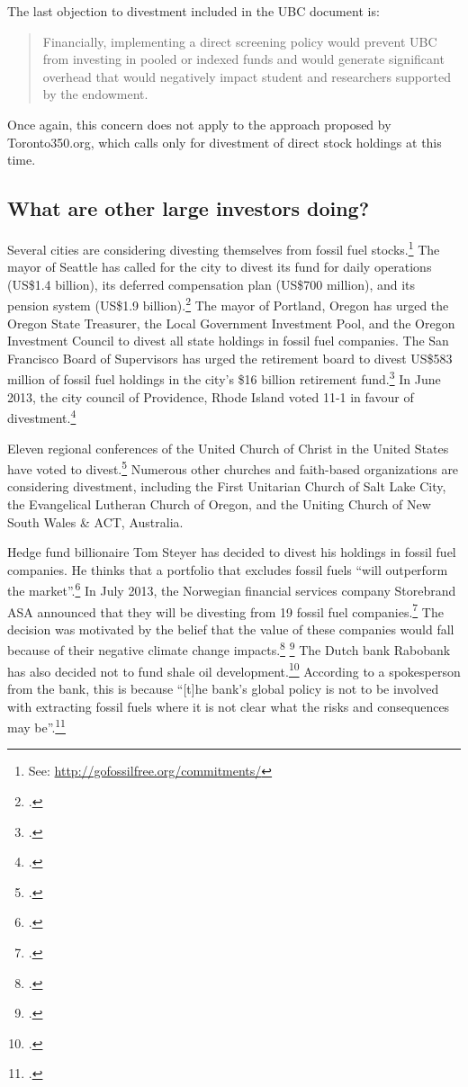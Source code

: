 The last objection to divestment included in the UBC document is:
\begin{quote}
Financially, implementing a direct screening policy would prevent UBC from investing in pooled or indexed funds and would generate significant overhead that would negatively impact student and researchers supported by the endowment.
\end{quote}
Once again, this concern does not apply to the approach proposed by Toronto350.org, which calls only for divestment of direct stock holdings at this time.



	\subsection{What are other large investors doing?}
	\label{LargeInvestors}



Several cities are considering divesting themselves from fossil fuel stocks.\footnote{See: \url{http://gofossilfree.org/commitments/}}
The mayor of Seattle has called for the city to divest its fund for daily operations (US\$1.4 billion), its deferred compensation plan (US\$700 million), and its pension system (US\$1.9 billion).\footcite[][]{SeattleDivest}
The mayor of Portland, Oregon has urged the Oregon State Treasurer, the Local Government Investment Pool, and the Oregon Investment Council to divest all state holdings in fossil fuel companies.
The San Francisco Board of Supervisors has urged the retirement board to divest US\$583 million of fossil fuel holdings in the city's \$16 billion retirement fund.\footcite[][]{DivestProtect40to60}
In June 2013, the city council of Providence, Rhode Island voted 11-1 in favour of divestment.\footcite[][]{ProvidenceDivest}



Eleven regional conferences of the United Church of Christ in the United States have voted to divest.\footcite[][]{ChurchesFFDivestment}
Numerous other churches and faith-based organizations are considering divestment, including the First Unitarian Church of Salt Lake City, the Evangelical Lutheran Church of Oregon, and the Uniting Church of New South Wales \& ACT, Australia.



Hedge fund billionaire Tom Steyer has decided to divest his holdings in fossil fuel companies.
He thinks that a portfolio that excludes fossil fuels ``will outperform the market''.\footcite[][]{SteyerMiddleburyLetter}
In July 2013, the Norwegian financial services company Storebrand ASA announced that they will be divesting from 19 fossil fuel companies.\footcite[][]{StorebrandPR}
The decision was motivated by the belief that the value of these companies would fall because of their negative climate change impacts.\footcite[][]{StorebrandNews} \footcite[See also: ][]{GristStorebrand}
The Dutch bank Rabobank has also decided not to fund shale oil development.\footcite[][]{RabobankRefuses}
According to a spokesperson from the bank, this is because ``[t]he bank's global policy is not to be involved with extracting fossil fuels where it is not clear what the risks and consequences may be''.\footcite[][]{RabobankNews}



